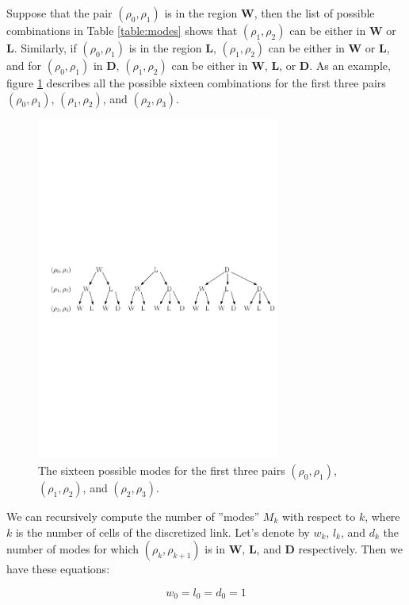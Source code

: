 Suppose that the pair $(\rho_{0},\rho_{1})$ is in the region \textbf{W}, then the list of possible combinations in Table \ref{table:modes} shows that $(\rho_{1},\rho_{2})$ can be either in \textbf{W} or \textbf{L}. Similarly, if $(\rho_{0},\rho_{1})$ is in the region \textbf{L}, $(\rho_{1},\rho_{2})$ can be either in \textbf{W} or \textbf{L}, and for $(\rho_{0},\rho_{1})$ in \textbf{D}, $(\rho_{1},\rho_{2})$ can be either in \textbf{W}, \textbf{L}, or \textbf{D}. As an example, figure \ref{fig:threeLevelModes} describes all the possible sixteen combinations for the first three pairs $(\rho_{0},\rho_{1})$, $(\rho_{1},\rho_{2})$, and $(\rho_{2},\rho_{3})$.

\begin{figure}[ht]
  \centering
    \includegraphics[width=8cm]{figures/threeLevelModes.pdf}
    \caption{The sixteen possible modes for the first three pairs $(\rho_{0},\rho_{1})$, $(\rho_{1},\rho_{2})$, and $(\rho_{2},\rho_{3})$.}
    \label{fig:threeLevelModes}
\end{figure}

We can recursively compute the number of ''modes'' $M_{k}$ with respect to $k$, where $k$ is the number of cells of the discretized link. Let's denote by $w_{k}$, $l_{k}$, and $d_{k}$ the number of modes for which $(\rho_{k},\rho_{k+1})$ is in \textbf{W}, \textbf{L}, and \textbf{D} respectively. Then we have these equations: 

\begin{equation}
w_{0} = l_{0} = d_{0} = 1
\label{eq:modes1}
\end{equation}

